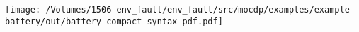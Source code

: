 
    \texttt{[image: /Volumes/1506-env\_fault/env\_fault/src/mocdp/examples/example-battery/out/battery\_compact-syntax\_pdf.pdf]}
    